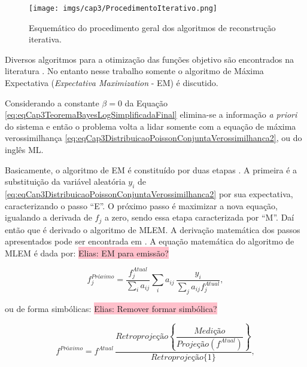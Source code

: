 {{\begin{figure}[H]
	\caption{Esquemático do procedimento geral dos algoritmos de reconstrução iterativa.}
	\begin{center}
		\texttt{[image: imgs/cap3/ProcedimentoIterativo.png]}
	\end{center}
	\label{fig:imgCap3ProcedimentoIterativo}
\end{figure}

Diversos algoritmos para a otimização das funções objetivo são encontrados na literatura \cite{Fessler2000handbook,das2011penalized,zeng2010medical,sidky2014iterative,xu2015statistical,zheng2018detector}. No entanto nesse trabalho somente o algoritmo de Máxima Expectativa (\textit{Expectativa Maximization} - \acs{EM}) é discutido.

Considerando a constante $\beta = 0$ da Equação \ref{eq:eqCap3TeoremaBayesLogSimplificadaFinal} elimina-se a informação \textit{a priori} do sistema e então o problema volta a lidar somente com a equação de máxima verossimilhança \eqref{eq:eqCap3DistribuicaoPoissonConjuntaVerossimilhanca2}, ou do inglês \acs{ML}.  

Basicamente, o algoritmo de \acs{EM} é constituído por duas etapas \cite[p. 149]{zeng2010medical}. A primeira é a substituição da variável aleatória $y_{i}$ de \eqref{eq:eqCap3DistribuicaoPoissonConjuntaVerossimilhanca2} por sua expectativa, caracterizando o passo ``E''. O próximo passo é maximizar a nova equação, igualando a derivada de $f_{j}$ a zero, sendo essa etapa caracterizada por ``M''. Daí então que é derivado o algoritmo de \acs{MLEM}. A derivação matemática dos passos apresentados pode ser encontrada em . A equação matemática do algoritmo de \acs{MLEM} é dada por:  \colorbox{pink}{Elias: EM para emissão?}

\begin{equation}
f_{j}^{Próximo} = \dfrac{f_{j}^{Atual}}{\sum_{i}^{} a_{ij}} \sum_{i}^{} a_{ij} \, \dfrac{y_{i}}{\sum_{j}^{} a_{ij}f_{j}^{Atual}},
\label{eq:eqCap3MLEM}
\end{equation}    

\noindent ou de forma simbólicas:  \colorbox{pink}{Elias: Remover formar simbólica?}

\begin{equation}
f^{Próximo} = f^{Atual} \, \dfrac{Retroprojeção\left\{\dfrac{Medição}{Projeção(f^{Atual})}\right\}}{Retroprojeção\{1\}},
\label{eq:eqCap3MLEMSimbolico}
\end{equation} 

}}
